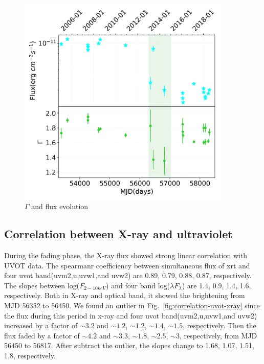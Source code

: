 \documentclass{aastex63}
\begin{document}
\begin{figure}
\centering
	\includegraphics[width=0.9\textwidth]{./pic/subplots-xrayappendgood-fandg-second.png}
    \caption{$\Gamma$ and flux evolution}
    \label{fig:xrayappendgood-fandg-secondaxis}
\end{figure}




\subsection{Correlation between X-ray and ultraviolet}
During the fading phase, the X-ray flux showed strong linear correlation with UVOT data. The spearmanr coefficiency between simultaneous flux of xrt and four uvot band(uvm2,u,uvw1,and uvw2) are 0.89, 0.79, 0.88, 0.87, respectively. The slopes between log($F_{2-10keV}$) and four band log($\lambda F_{\lambda}$) are 1.4, 0.9, 1.4, 1.6, respectively. Both in X-ray and optical band, it showed the brightening from MJD 56352 to 56450. We found an outlier in Fig.~\ref{fig:correlation-uvot-xray} since the flux during this period in x-ray and four uvot  band(uvm2,u,uvw1,and uvw2) increased by a factor of $\sim 3.2$ and $\sim 1.2$, $\sim 1.2$, $\sim 1.4$, $\sim 1.5$, respectively. Then the flux faded by a factor of $\sim 4.2$ and $\sim 3.3$, $\sim 1.8$, $\sim 2.5$, $\sim 3$, respectively, from MJD 56450 to 56817. After subtract the outlier, the slopes change to 1.68, 1.07, 1.51, 1.8, respectively.
\end{document}
